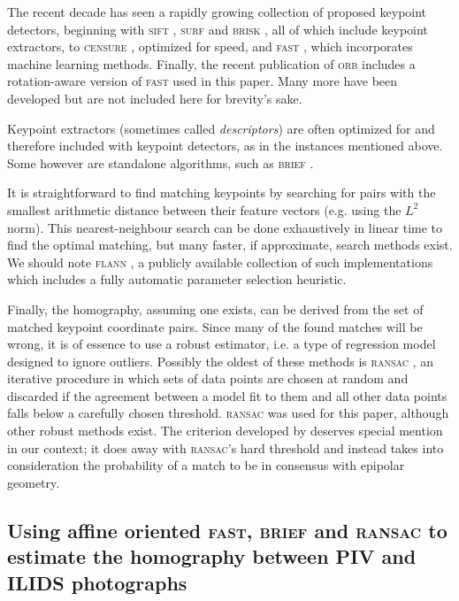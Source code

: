 \documentclass[11.5pt,oneside]{book}
\begin{document}
The recent decade has seen a rapidly growing collection of proposed keypoint detectors,
beginning with \textsc{sift} \cite{Lowe04}, \textsc{surf} \cite{Bay08} and
\textsc{brisk} \cite{Leutenegger11}, all of which include keypoint extractors, to
\textsc{censure} \cite{Agrawal08}, optimized for speed, and
\textsc{fast} \cite{Rosten05}, which incorporates machine learning methods.
Finally, the recent publication of \textsc{orb} \cite{Rublee11} includes a
rotation-aware version of \textsc{fast} used in this paper. Many more have been
developed but are not included here for brevity's sake.

Keypoint extractors (sometimes called \emph{descriptors}) are often optimized
for and therefore included with keypoint detectors, as in the instances
mentioned above. Some however are standalone algorithms, such as
\textsc{brief} \cite{Calonder10}.

It is straightforward to find matching keypoints by searching for pairs
with the smallest arithmetic distance between their feature vectors (e.g. using the $L^2$ norm). This nearest-neighbour search
can be done exhaustively in linear time to find the optimal matching, but many
faster, if approximate, search methods exist. We should note \textsc{flann} \cite{Muja09},
a publicly available collection of such implementations which includes a fully
automatic parameter selection heuristic.

Finally, the homography, assuming one exists, can be derived from the set of
matched keypoint coordinate pairs. Since many of the found matches will be
wrong, it is of essence to use a robust estimator, i.e. a type of regression
model designed to ignore outliers. Possibly the oldest of these methods is
\textsc{ransac} \cite{Fischler81}, an iterative procedure in which sets of data points are
chosen at random and discarded if the agreement between a model fit to them and
all other data points falls below a carefully chosen threshold. \textsc{ransac} was used
for this paper, although other robust methods exist. The criterion developed by
\citet{Moisan04} deserves special mention in our context; it does away with
\textsc{ransac}'s hard threshold and instead takes into consideration the probability of
a match to be in consensus with epipolar geometry.

\subsection{Using affine oriented \textsc{fast}, \textsc{brief} and \textsc{ransac} to estimate the homography
between PIV and ILIDS photographs \label{sec:results}}
\end{document}
